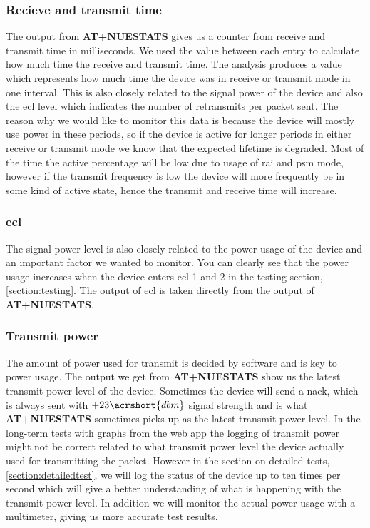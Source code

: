\documentclass[USenglish]{ifimaster}  %
\begin{document}
\subsubsection{Recieve and transmit time}
The output from \textbf{AT+NUESTATS} gives us a counter from receive and transmit time in milliseconds. We used the value between each entry to calculate how much time the receive and transmit time. The analysis produces a value which represents how much time the device was in receive or transmit mode in one interval. This is also closely related to the signal power of the device and also the \acrshort{ecl} level which indicates the number of retransmits per packet sent. The reason why we would like to monitor this data is because the device will mostly use power in these periods, so if the device is active for longer periods in either receive or transmit mode we know that the expected lifetime is degraded. Most of the time the active percentage will be low due to usage of \acrfull{rai} and \acrshort{psm} mode, however if the transmit frequency is low the device will more frequently be in some kind of active state, hence the transmit and receive time will increase.

\subsubsection{\acrshort{ecl}}
The signal power level is also closely related to the power usage of the device and an important factor we wanted to monitor. You can clearly see that the power usage increases when the device enters \acrshort{ecl} 1 and 2 in the testing section, \vref{section:testing}. The output of \acrshort{ecl} is taken directly from the output of \textbf{AT+NUESTATS}.

\subsubsection{Transmit power} \label{paragraph:txpower}
The amount of power used for transmit is decided by software and is key to power usage. The output we get from \textbf{AT+NUESTATS} show us the latest transmit power level of the device. Sometimes the device will send a \acrfull{nack}, which is always sent with ${+23 \acrshort{dbm}}$ signal strength and is what \textbf{AT+NUESTATS} sometimes picks up as the latest transmit power level\cite{email:nack}. In the long-term tests with graphs from the web app the logging of transmit power might not be correct related to what transmit power level the device actually used for transmitting the packet. However in the section on detailed tests, \vref{section:detailedtest}, we will log the status of the device up to ten times per second which will give a better understanding of what is happening with the transmit power level. In addition we will monitor the actual power usage with a multimeter, giving us more accurate test results.
\end{document}
